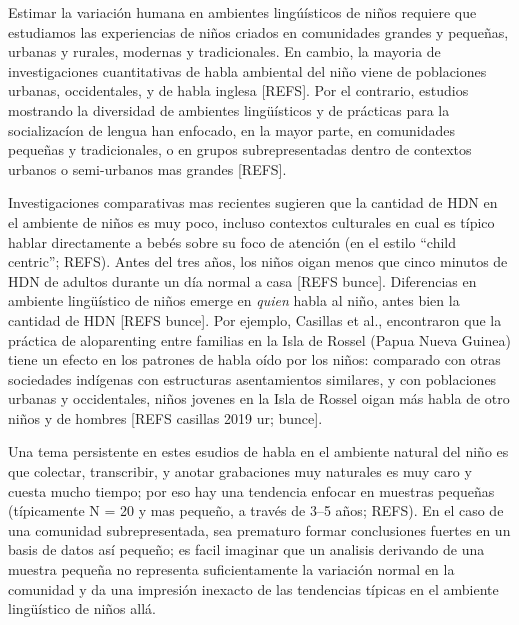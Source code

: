 \documentclass[
  english,
  ,man,floatsintext]{apa6}
\begin{document}
Estimar la variación humana en ambientes lingúísticos de niños requiere que estudiamos las experiencias de niños criados en comunidades grandes y pequeñas, urbanas y rurales, modernas y tradicionales. En cambio, la mayoria de investigaciones cuantitativas de habla ambiental del niño viene de poblaciones urbanas, occidentales, y de habla inglesa {[}REFS{]}. Por el contrario, estudios mostrando la diversidad de ambientes lingüísticos y de prácticas para la socializacíon de lengua han enfocado, en la mayor parte, en comunidades pequeñas y tradicionales, o en grupos subrepresentadas dentro de contextos urbanos o semi-urbanos mas grandes {[}REFS{]}.

Investigaciones comparativas mas recientes sugieren que la cantidad de HDN en el ambiente de niños es muy poco, incluso contextos culturales en cual es típico hablar directamente a bebés sobre su foco de atención (en el estilo ``child centric''; REFS). Antes del tres años, los niños oigan menos que cinco minutos de HDN de adultos durante un día normal a casa {[}REFS bunce{]}. Diferencias en ambiente lingüístico de niños emerge en \emph{quien} habla al niño, antes bien la cantidad de HDN {[}REFS bunce{]}. Por ejemplo, Casillas et al., encontraron que la práctica de aloparenting entre familias en la Isla de Rossel (Papua Nueva Guinea) tiene un efecto en los patrones de habla oído por los niños: comparado con otras sociedades indígenas con estructuras asentamientos similares, y con poblaciones urbanas y occidentales, niños jovenes en la Isla de Rossel oigan más habla de otro niños y de hombres {[}REFS casillas 2019 ur; bunce{]}.

Una tema persistente en estes esudios de habla en el ambiente natural del niño es que colectar, transcribir, y anotar grabaciones muy naturales es muy caro y cuesta mucho tiempo; por eso hay una tendencia enfocar en muestras pequeñas (típicamente N = 20 y mas pequeño, a través de 3--5 años; REFS). En el caso de una comunidad subrepresentada, sea prematuro formar conclusiones fuertes en un basis de datos así pequeño; es facil imaginar que un analisis derivando de una muestra pequeña no representa suficientamente la variación normal en la comunidad y da una impresión inexacto de las tendencias típicas en el ambiente lingüístico de niños allá.
\end{document}
